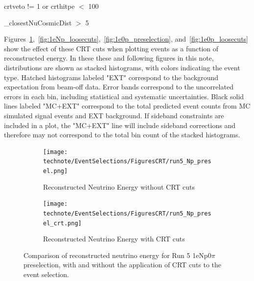 \begin{center}
    crtveto != 1  or crthitpe \(<\) 100 
\end{center}
\begin{center}
    \_closestNuCosmicDist \(>\) 5
\end{center}

Figures~\ref{fig:1eNp_preselection},~\ref{fig:1eNp_loosecuts},~\ref{fig:1e0p_preselection}, and~\ref{fig:1e0p_loosecuts} show the effect of these CRT cuts when plotting events as a function of reconstructed energy. In these these and following figures in this note, distributions are shown as stacked histograms, with colors indicating the event type. Hatched histograms labeled "EXT" correspond to the background expectation from beam-off data. Error bands correspond to the uncorrelated errors in each bin, including statistical and systematic uncertainties. Black solid lines labeled "MC+EXT" correspond to the total predicted event counts from MC simulated signal events and EXT background. If sideband constraints are included in a plot, the "MC+EXT" line will include sideband corrections and therefore may not correspond to the total bin count of the stacked histograms.

\begin{figure}[H] \centering
    \begin{subfigure}[t]{0.45\linewidth}
        \texttt{[image: technote/EventSelections/FiguresCRT/run5\_Np\_presel.png]}
        \caption{Reconstructed Neutrino Energy without CRT cuts}
    \end{subfigure}%
    \hspace{0.45cm}%
    \begin{subfigure}[t]{0.45\linewidth}
        \texttt{[image: technote/EventSelections/FiguresCRT/run5\_Np\_presel\_crt.png]}%
        \caption{Reconstructed Neutrino Energy with CRT cuts}
    \end{subfigure}%
    \caption{Comparison of reconstructed neutrino energy for Run 5 1eNp0$\pi$ preselection, with and without the application of CRT cuts to the event selection.}
    \label{fig:1eNp_preselection}
\end{figure}

